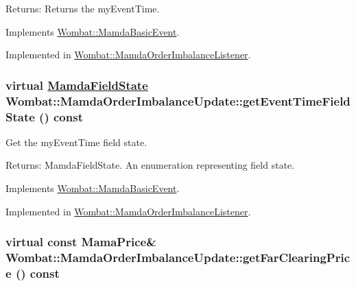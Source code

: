 \begin{Desc}
\item[Returns:]Returns the my\-Event\-Time. \end{Desc}


Implements \hyperlink{classWombat_1_1MamdaBasicEvent_7285491c2c657207a64b1b0449c0339b}{Wombat::Mamda\-Basic\-Event}.

Implemented in \hyperlink{classWombat_1_1MamdaOrderImbalanceListener_6cac146703cca68aecfd579f512d8b99}{Wombat::Mamda\-Order\-Imbalance\-Listener}.\hypertarget{classWombat_1_1MamdaOrderImbalanceUpdate_ba5f05bfc7bc6b771c670b9184db39d0}{
\subsubsection[getEventTimeFieldState]{\setlength{\rightskip}{0pt plus 5cm}virtual \hyperlink{namespaceWombat_93aac974f2ab713554fd12a1fa3b7d2a}{Mamda\-Field\-State} Wombat::Mamda\-Order\-Imbalance\-Update::get\-Event\-Time\-Field\-State () const}}
\label{classWombat_1_1MamdaOrderImbalanceUpdate_ba5f05bfc7bc6b771c670b9184db39d0}


Get the my\-Event\-Time field state. 

\begin{Desc}
\item[Returns:]Mamda\-Field\-State. An enumeration representing field state. \end{Desc}


Implements \hyperlink{classWombat_1_1MamdaBasicEvent_ff3932065e16e660fb6cd9285b46f7d0}{Wombat::Mamda\-Basic\-Event}.

Implemented in \hyperlink{classWombat_1_1MamdaOrderImbalanceListener_b9da1457422c7e005b4d1cb097621e01}{Wombat::Mamda\-Order\-Imbalance\-Listener}.\hypertarget{classWombat_1_1MamdaOrderImbalanceUpdate_ddb07f37f8b0c39af4014e6246a7c854}{
\subsubsection[getFarClearingPrice]{\setlength{\rightskip}{0pt plus 5cm}virtual const Mama\-Price\& Wombat::Mamda\-Order\-Imbalance\-Update::get\-Far\-Clearing\-Price () const}}
\label{classWombat_1_1MamdaOrderImbalanceUpdate_ddb07f37f8b0c39af4014e6246a7c854}


